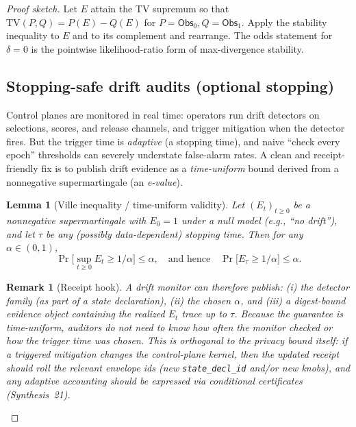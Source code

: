 \documentclass[11pt]{article}
\newtheorem{lemma}{Lemma}
\newtheorem{remark}{Remark}
\newcommand{\TV}{\mathrm{TV}}
\begin{document}
\begin{proof}[Proof sketch]
Let $E$ attain the TV supremum so that $\TV(P,Q)=P(E)-Q(E)$ for $P=\mathsf{Obs}_0,Q=\mathsf{Obs}_1$.
Apply the stability inequality to $E$ and to its complement and rearrange.
The odds statement for $\delta=0$ is the pointwise likelihood-ratio form of max-divergence stability.

\subsection{Stopping-safe drift audits (optional stopping)}
Control planes are monitored in real time: operators run drift detectors on selections, scores, and release channels, and trigger mitigation when the detector fires.
But the trigger time is \emph{adaptive} (a stopping time), and naive ``check every epoch'' thresholds can severely understate false-alarm rates.
A clean and receipt-friendly fix is to publish drift evidence as a \emph{time-uniform} bound derived from a nonnegative supermartingale (an \emph{e-value}).\cite{howard2018cher,wang2020ebh}

\begin{lemma}[Ville inequality / time-uniform validity]
Let $(E_t)_{t\ge 0}$ be a nonnegative supermartingale with $E_0=1$ under a null model (e.g., ``no drift''), and let $\tau$ be any (possibly data-dependent) stopping time.
Then for any $\alpha\in(0,1)$,
\[
\Pr\Big[\sup_{t\ge 0} E_t \ge 1/\alpha\Big] \le \alpha,
\quad\text{and hence}\quad
\Pr\big[E_{\tau}\ge 1/\alpha\big]\le \alpha.
\]
\end{lemma}

\begin{remark}[Receipt hook]
A drift monitor can therefore publish: (i) the detector family (as part of a state declaration), (ii) the chosen $\alpha$, and (iii) a digest-bound evidence object containing the realized $E_t$ trace up to $\tau$.
Because the guarantee is time-uniform, auditors do not need to know how often the monitor checked or how the trigger time was chosen.
This is orthogonal to the privacy bound itself: if a triggered mitigation changes the control-plane kernel, then the updated receipt should roll the relevant envelope ids (new \texttt{state\_decl\_id} and/or new knobs), and any adaptive accounting should be expressed via conditional certificates (Synthesis~21).\cite{series:condcert,series:planstateequiv}
\end{remark}


\end{proof}
\end{document}
